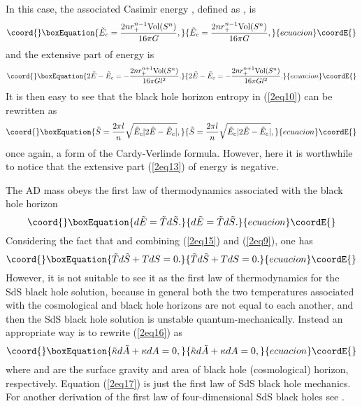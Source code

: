 \documentclass[a4paper,12pt]{article}
\begin{document}
 In this case, the associated 
Casimir energy \coordHE{}, defined as \coordHE{},
is
\begin{equation}\coord{}\boxEquation{
\label{2eq12}
\tilde E_c =\frac{2n r_+^{n-1}\mbox{Vol}(S^n)}{16\pi G},
}{
\tilde E_c =\frac{2n r_+^{n-1}\mbox{Vol}(S^n)}{16\pi G},
}{ecuacion}\coordE{}\end{equation}
and the extensive part of energy is 
\begin{equation}\coord{}\boxEquation{
\label{2eq13}
2\tilde E-\tilde E_c =-\frac{2nr_+^{n+1} \mbox{Vol}(S^n)}{16\pi G l^2}.
}{
2\tilde E-\tilde E_c =-\frac{2nr_+^{n+1} \mbox{Vol}(S^n)}{16\pi G l^2}.
}{ecuacion}\coordE{}\end{equation}
It is then easy to see that the black hole horizon entropy in (\ref{2eq10}) can 
be rewritten as
\begin{equation}\coord{}\boxEquation{
\label{2eq14}
\tilde S= \frac{2\pi l}{n}\sqrt{\tilde E_c|2\tilde E-\tilde E_c|},
}{
\tilde S= \frac{2\pi l}{n}\sqrt{\tilde E_c|2\tilde E-\tilde E_c|},
}{ecuacion}\coordE{}\end{equation}
once again, a form of the Cardy-Verlinde formula. However, here it is worthwhile to notice
that the extensive part (\ref{2eq13}) of energy is negative. 

The AD mass obeys the first law of thermodynamics associated with the black hole horizon
\begin{equation}\coord{}\boxEquation{
\label{2eq15}
d\tilde E=\tilde Td\tilde S.
}{
d\tilde E=\tilde Td\tilde S.
}{ecuacion}\coordE{}\end{equation}
Considering the fact that \coordHE{} and combining (\ref{2eq15}) and (\ref{2eq9}),
one has
\begin{equation}\coord{}\boxEquation{
\label{2eq16}
\tilde Td\tilde S +TdS=0.
}{
\tilde Td\tilde S +TdS=0.
}{ecuacion}\coordE{}\end{equation}
However, it is not suitable to see it as the first law 
of thermodynamics for the SdS black hole solution, because in general both the two temperatures
associated with the cosmological and black hole horizons are not equal to each another, and
then the SdS black hole solution is unstable quantum-mechanically. Instead an appropriate
way is to rewrite (\ref{2eq16}) as
\begin{equation}\coord{}\boxEquation{
\label{2eq17}
\tilde \kappa d\tilde A+\kappa dA=0,
}{
\tilde \kappa d\tilde A+\kappa dA=0,
}{ecuacion}\coordE{}\end{equation} 
where \myHighlight{$\tilde \kappa (\kappa)$}\coordHE{} and \coordHE{} are the surface gravity and  area
of black hole (cosmological) horizon, respectively. Equation (\ref{2eq17}) is just the first
law of SdS black hole mechanics.  For another derivation of the first law of four-dimensional
SdS black holes see \cite{GH}.   
\end{document}
